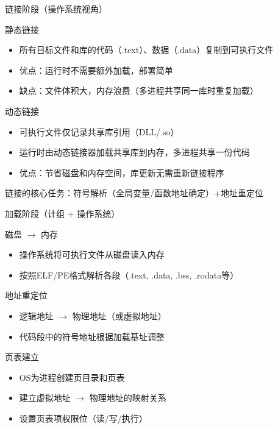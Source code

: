 \documentclass[10pt, aspectratio=169]{beamer}
\begin{document}
\begin{frame}{链接阶段（操作系统视角）}
    \begin{block}{静态链接}
        \begin{itemize}
            \item 所有目标文件和库的代码（.text）、数据（.data）复制到可执行文件
            \item 优点：运行时不需要额外加载，部署简单
            \item 缺点：文件体积大，内存浪费（多进程共享同一库时重复加载）
        \end{itemize}
    \end{block}
    \begin{block}{动态链接}
        \begin{itemize}
            \item 可执行文件仅记录共享库引用（DLL/.so）
            \item 运行时由动态链接器加载共享库到内存，多进程共享一份代码
            \item 优点：节省磁盘和内存空间，库更新无需重新链接程序
        \end{itemize}
    \end{block}
    \vspace{0.3em}
    \alert{链接的核心任务：符号解析（全局变量/函数地址确定）\;+\;地址重定位}
\end{frame}

\begin{frame}{加载阶段（计组 + 操作系统）}
    \begin{block}{磁盘 $\to$ 内存}
        \begin{itemize}
            \item 操作系统将可执行文件从磁盘读入内存
            \item 按照ELF/PE格式解析各段（.text, .data, .bss, .rodata等）
        \end{itemize}
    \end{block}
    \begin{block}{地址重定位}
        \begin{itemize}
            \item 逻辑地址 $\to$ 物理地址（或虚拟地址）
            \item 代码段中的符号地址根据加载基址调整
        \end{itemize}
    \end{block}
    \begin{block}{页表建立}
        \begin{itemize}
            \item OS为进程创建页目录和页表
            \item 建立虚拟地址 $\to$ 物理地址的映射关系
            \item 设置页表项权限位（读/写/执行）
        \end{itemize}
    \end{block}
\end{frame}
\end{document}
